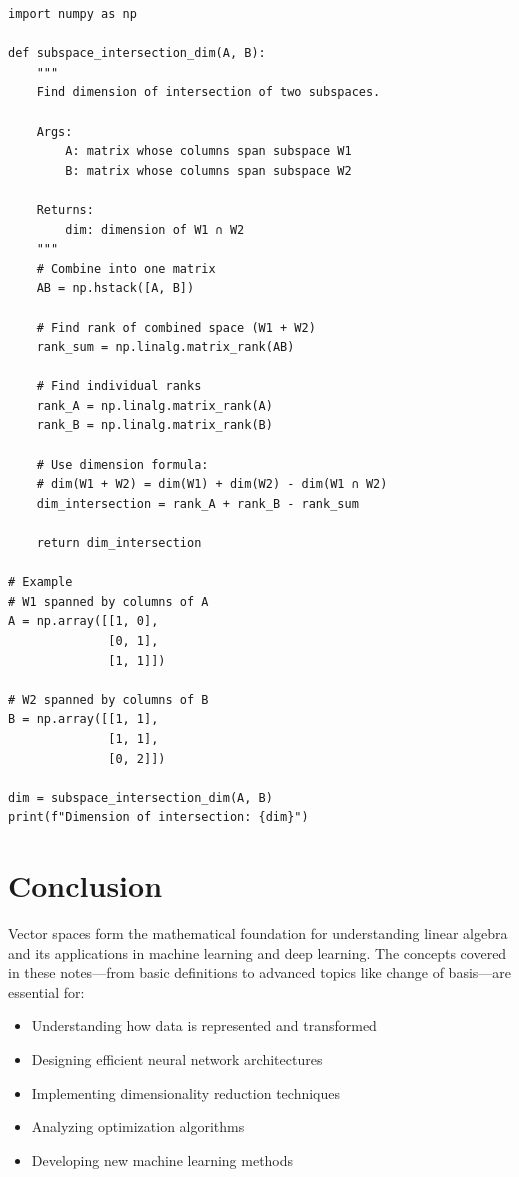 \documentclass[12pt,a4paper]{article}
\theoremstyle{definition}
\begin{document}
\begin{verbatim}
import numpy as np

def subspace_intersection_dim(A, B):
    """
    Find dimension of intersection of two subspaces.
    
    Args:
        A: matrix whose columns span subspace W1
        B: matrix whose columns span subspace W2
    
    Returns:
        dim: dimension of W1 ∩ W2
    """
    # Combine into one matrix
    AB = np.hstack([A, B])
    
    # Find rank of combined space (W1 + W2)
    rank_sum = np.linalg.matrix_rank(AB)
    
    # Find individual ranks
    rank_A = np.linalg.matrix_rank(A)
    rank_B = np.linalg.matrix_rank(B)
    
    # Use dimension formula:
    # dim(W1 + W2) = dim(W1) + dim(W2) - dim(W1 ∩ W2)
    dim_intersection = rank_A + rank_B - rank_sum
    
    return dim_intersection

# Example
# W1 spanned by columns of A
A = np.array([[1, 0],
              [0, 1],
              [1, 1]])

# W2 spanned by columns of B  
B = np.array([[1, 1],
              [1, 1],
              [0, 2]])

dim = subspace_intersection_dim(A, B)
print(f"Dimension of intersection: {dim}")
\end{verbatim}

\section{Conclusion}

Vector spaces form the mathematical foundation for understanding linear algebra and its applications in machine learning and deep learning. The concepts covered in these notes—from basic definitions to advanced topics like change of basis—are essential for:

\begin{itemize}
    \item Understanding how data is represented and transformed
    \item Designing efficient neural network architectures
    \item Implementing dimensionality reduction techniques
    \item Analyzing optimization algorithms
    \item Developing new machine learning methods
\end{itemize}
\end{document}
